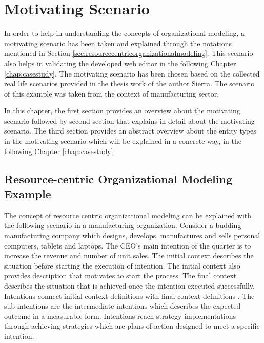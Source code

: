 \chapter{Motivating Scenario}
\label{chap:motivatingScenario}
In order to help in understanding the concepts of organizational modeling, a motivating scenario has been taken and explained through the notations mentioned in Section \ref{sec:resourcecentricorganizationalmodeling}. This scenario also helps in validating the developed web editor in the following Chapter \ref{chap:casestudy}. The motivating scenario has been chosen based on the collected real life scenarios provided in the thesis work of the author Sierra\cite{Sierr2015}. The scenario of this example was taken from the context of manufacturing sector. 

In this chapter, the first section provides an overview about the motivating scenario followed by second section that explains in detail about the motivating scenario. The third section provides an abstract overview about the entity types in the motivating scenario which will be explained in a concrete way, in the following Chapter \ref{chap:casestudy}.

\section{Resource-centric Organizational Modeling Example}
\label{sec:scenario}
 The concept of resource centric organizational modeling can be explained with the following scenario in a manufacturing organization. Consider a budding manufacturing company which designs, develops, manufactures and sells personal computers, tablets and laptops. The CEO's main intention of the quarter is to increase the revenue and number of unit sales. The initial context describes the situation before starting the execution of intention. The initial context also provides description that motivates to start the process. The final context describes the situation that is achieved once the intention executed successfully. Intentions connect initial context definitions with final context definitions \cite{Sungur2014a}. The sub-intentions are the intermediate intentions which describes the expected outcome in a measurable form. Intentions reach strategy implementations through achieving strategies which are plans of action designed to meet a specific intention. 
 

